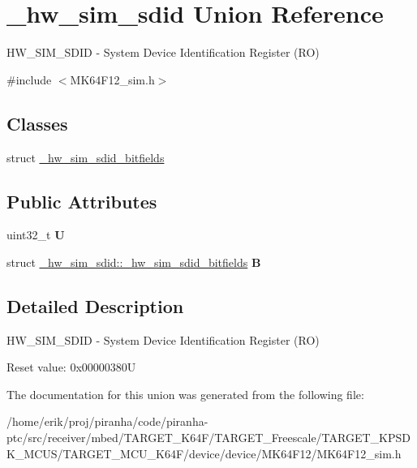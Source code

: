\hypertarget{union__hw__sim__sdid}{}\section{\+\_\+hw\+\_\+sim\+\_\+sdid Union Reference}
\label{union__hw__sim__sdid}


H\+W\+\_\+\+S\+I\+M\+\_\+\+S\+D\+ID -\/ System Device Identification Register (RO)  




{\ttfamily \#include $<$M\+K64\+F12\+\_\+sim.\+h$>$}

\subsection*{Classes}
\begin{DoxyCompactItemize}
\item 
struct \hyperlink{struct__hw__sim__sdid_1_1__hw__sim__sdid__bitfields}{\+\_\+hw\+\_\+sim\+\_\+sdid\+\_\+bitfields}
\end{DoxyCompactItemize}
\subsection*{Public Attributes}
\begin{DoxyCompactItemize}
\item 
uint32\+\_\+t {\bfseries U}\hypertarget{union__hw__sim__sdid_a00dcc89432f243fc86957ab056cede8b}{}\label{union__hw__sim__sdid_a00dcc89432f243fc86957ab056cede8b}

\item 
struct \hyperlink{struct__hw__sim__sdid_1_1__hw__sim__sdid__bitfields}{\+\_\+hw\+\_\+sim\+\_\+sdid\+::\+\_\+hw\+\_\+sim\+\_\+sdid\+\_\+bitfields} {\bfseries B}\hypertarget{union__hw__sim__sdid_a953e9bc8551cf0a09c3693dd518ef43e}{}\label{union__hw__sim__sdid_a953e9bc8551cf0a09c3693dd518ef43e}

\end{DoxyCompactItemize}


\subsection{Detailed Description}
H\+W\+\_\+\+S\+I\+M\+\_\+\+S\+D\+ID -\/ System Device Identification Register (RO) 

Reset value\+: 0x00000380U 

The documentation for this union was generated from the following file\+:\begin{DoxyCompactItemize}
\item 
/home/erik/proj/piranha/code/piranha-\/ptc/src/receiver/mbed/\+T\+A\+R\+G\+E\+T\+\_\+\+K64\+F/\+T\+A\+R\+G\+E\+T\+\_\+\+Freescale/\+T\+A\+R\+G\+E\+T\+\_\+\+K\+P\+S\+D\+K\+\_\+\+M\+C\+U\+S/\+T\+A\+R\+G\+E\+T\+\_\+\+M\+C\+U\+\_\+\+K64\+F/device/device/\+M\+K64\+F12/M\+K64\+F12\+\_\+sim.\+h\end{DoxyCompactItemize}
